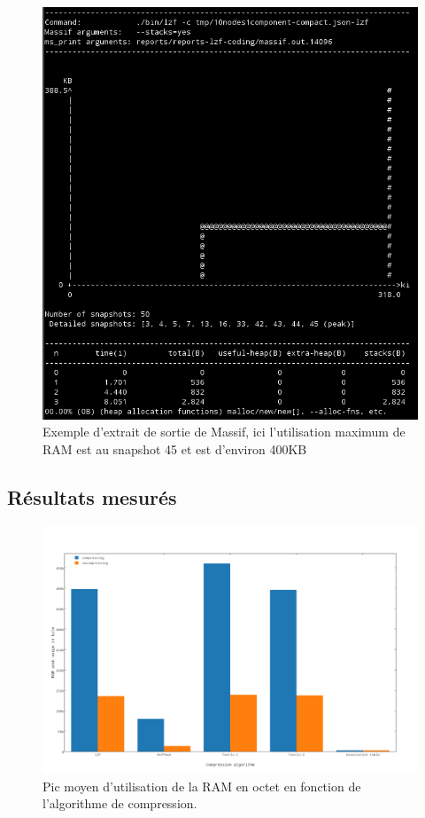 \begin{figure}[ht!]
\centering
\includegraphics[scale=0.7]{images/msprint.png}
\caption{Exemple d'extrait de sortie de Massif, ici l'utilisation maximum de RAM est au snapshot 45 et est d'environ 400KB}
\end{figure}

\subsection{Résultats mesurés}

\begin{figure}[ht!]
\centering
\includegraphics[scale=0.4]{images/comp-memory.png}
\caption{Pic moyen d'utilisation de la RAM en octet en fonction de l'algorithme de compression.}
\end{figure}

